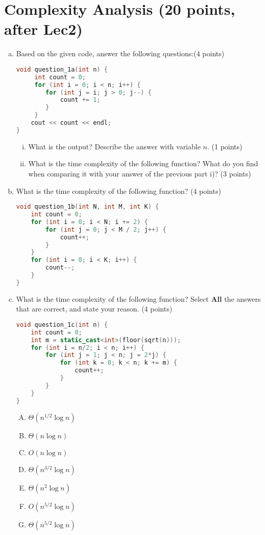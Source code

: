 \documentclass[11pt]{exam}
\begin{document}
\section{Complexity Analysis (20 points, after Lec2)}

\begin{enumerate}[(a)]

\item Based on the given code, answer the following questions:(4 points)
\begin{lstlisting}[language=c++]
void question_1a(int n) {
	 int count = 0;
	 for (int i = 0; i < n; i++) {
	 	for (int j = i; j > 0; j--) {
	 		count += 1;
	 	}
	 }
	cout << count << endl;
}
\end{lstlisting}
\begin{enumerate}[i)]
\item What is the output? Describe the answer with variable $n$. (1 points)
\item What is the time complexity of the following function? What do you find when comparing it with your answer of the previous part i)? (3 points)
\end{enumerate}

\begin{solution}
\end{solution}

\item What is the time complexity of the following function? (4 points)
\begin{lstlisting}[language=c++]
void question_1b(int N, int M, int K) {
	int count = 0;
	for (int i = 0; i < N; i += 2) {
		for (int j = 0; j < M / 2; j++) {
			count++;
		}
	}
	for (int i = 0; i < K; i++) {
		count--;
	}
}
\end{lstlisting}

\begin{solution}
\end{solution}

\item What is the time complexity of the following function? Select \textbf{All} the answers that are correct, and state your reason.  (4 points)
\begin{lstlisting}[language=c++]
void question_1c(int n) {
	int count = 0;
	int m = static_cast<int>(floor(sqrt(n)));
	for (int i = n/2; i < n; i++) {
		for (int j = 1; j < n; j = 2*j) {
			for (int k = 0; k < n; k += m) {
				count++;
			}
		}
	}
}
\end{lstlisting}
\begin{enumerate}[A)]
\item $\Theta(n^{1/2}\log n)$
\item $\Theta(n \log n)$
\item $O(n \log n)$
\item $\Theta(n^{3/2}\log n)$
\item $\Theta(n^2\log n)$
\item $O(n^{5/2}\log n)$
\item $\Theta(n^{5/2}\log n)$
\end{enumerate}
\begin{solution}
\end{solution}


\end{enumerate}
\end{document}
